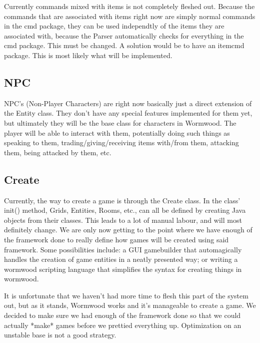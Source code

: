 \documentclass[12pt]{report}
\begin{document}
Currently commands mixed with items is not completely fleshed out. Because 
the commands that are associated with items right now are simply normal 
commands in the cmd package, they can be used independtly of the items they
are associated with, because the Parser automatically checks for everything
in the cmd package. This must be changed. A solution would be to have an
itemcmd package. This is most likely what will be implemented.

\subsection{NPC}
NPC's (Non-Player Characters) are right now basically just a direct extension of the Entity class.
They don't have any special features implemented for them yet, but ultimately
they will be the base class for characters in Wormwood. The player will be
able to interact with them, potentially doing such things as speaking to them,
trading/giving/receiving items with/from them, attacking them, being attacked
by them, etc.

\subsection{Create}
Currently, the way to create a game is through the Create class. In the class'
init() method, Grids, Entities, Rooms, etc., can all be defined by creating
Java objects from their classes. This leads to a lot of manual labour, and
will most definitely change. We are only now getting to the point where
we have enough of the framework done to really define how games will be 
created using said framework. Some possibilities include: a GUI
gamebuilder that automagically handles the creation of game entities in 
a neatly presented way; or writing a wormwood scripting language that simplifies
the syntax for creating things in wormwood. 

It is unfortunate that we haven't had more time to flesh this part of the 
system out, but as it stands, Wormwood works and it's manageable to create
a game. We decided to make sure we had enough of the framework done so 
that we could actually *make* games before we prettied everything up. 
Optimization on an unstable base is not a good strategy.
\end{document}
